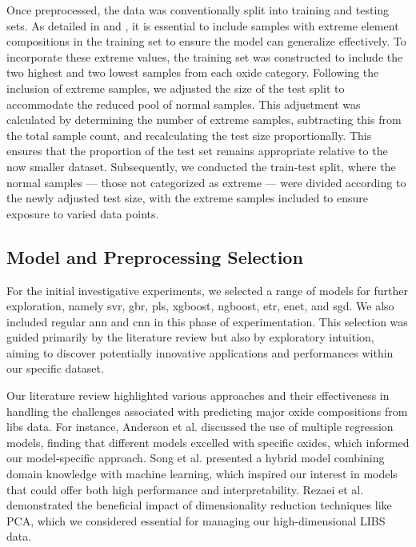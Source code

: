 Once preprocessed, the data was conventionally split into training and testing sets. 
As detailed in \citet{p9_paper} and \citet{cleggRecalibrationMarsScience2017}, it is essential to include samples with extreme element compositions in the training set to ensure the model can generalize effectively.
To incorporate these extreme values, the training set was constructed to include the two highest and two lowest samples from each oxide category.
Following the inclusion of extreme samples, we adjusted the size of the test split to accommodate the reduced pool of normal samples. 
This adjustment was calculated by determining the number of extreme samples, subtracting this from the total sample count, and recalculating the test size proportionally. 
This ensures that the proportion of the test set remains appropriate relative to the now smaller dataset. 
Subsequently, we conducted the train-test split, where the normal samples --- those not categorized as extreme --- were divided according to the newly adjusted test size, with the extreme samples included to ensure exposure to varied data points.

\subsection{Model and Preprocessing Selection}
For the initial investigative experiments, we selected a range of models for further exploration, namely \gls{svr}, \gls{gbr}, \gls{pls}, \gls{xgboost}, \gls{ngboost}, \gls{etr}, \gls{enet}, and \gls{sgd}.
We also included regular \gls{ann} and \gls{cnn} in this phase of experimentation. 
This selection was guided primarily by the literature review but also by exploratory intuition, aiming to discover potentially innovative applications and performances within our specific dataset.

Our literature review highlighted various approaches and their effectiveness in handling the challenges associated with predicting major oxide compositions from \gls{libs} data. 
For instance, Anderson et al. discussed the use of multiple regression models, finding that different models excelled with specific oxides, which informed our model-specific approach. 
Song et al. presented a hybrid model combining domain knowledge with machine learning, which inspired our interest in models that could offer both high performance and interpretability. Rezaei et al. demonstrated the beneficial impact of dimensionality reduction techniques like PCA, which we considered essential for managing our high-dimensional LIBS data.

